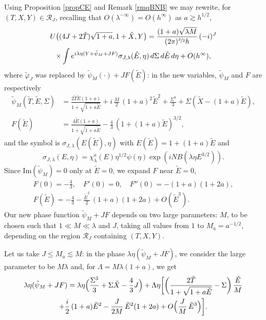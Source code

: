 \documentclass[JEP,XML,SOM,Unicode,NoEqCountersInSection,NoFloatCountersInSection,published]{cedram}
\let\mathcal\mathscr
\theoremstyle{plain}
\theoremstyle{definition}
\newcommand{\DomainXYT}{\mathcal{R}}
\begin{document}
Using Proposition \ref{propCE} and Remark \ref{rmqBNB} we may rewrite, for $(T,X,Y)\in \DomainXYT_{J}$, recalling that $O(\lambda^{-\infty})=O(h^{\infty})$ as $a\gtrsim h^{1/2}$,
\begin{multline}
\label{eq:67}
U\bigl((4J+2\tilde T)\sqrt{1+a},1+\tilde X,Y\bigr) = \frac{(1+a)\sqrt {\lambda M}}{(2\pi)^{\sfrac 32}h}\, (-i)^{J} \\
\times \int e^{i\lambda\eta (Y+\tilde\psi_{M}+JF)} \sigma_{J,\lambda }(\tilde E,\eta)\,d\Sigma \,d{\tilde E} \,d\eta +O(h^{\infty}),
\end{multline}
where $\tilde\varphi_J$ was replaced by $\tilde\psi_{M}(\cdot)+JF({\tilde E})$: in the new variables, $\tilde\psi_{M}$ and $F$ are respectively
\begin{align*}
\tilde\psi_{M} (\tilde T,{\tilde E},\Sigma) & =\frac{2\tilde T {\tilde E}(1+a)}{1+\sqrt{1+a{\tilde E}}}+i\,\frac M2\, (1+a)^2 {\tilde E}^2+\frac{\Sigma^3}{3}+\Sigma(\tilde X-(1+a){\tilde E}), \\
\label{eq:68}
F({\tilde E}) & =\frac{4{\tilde E}(1+a)}{1+\sqrt{1+a{\tilde E}}}-\frac 43\, (1+(1+a){\tilde E})^{3/2},
\end{align*}
and the symbol is $\sigma_{J,\lambda}(E(\tilde E),\eta)$ with $E(\tilde E)=1+(1+a)\tilde E$ and
\[
\sigma_{J,\lambda}(E,\eta)=\chi^a_{\lambda}(E)\eta^{1/2}\psi(\eta) \exp(i NB(\lambda \eta E^{3/2})).
\]
Since $\mathrm{Im}(\tilde\psi_{M})=0$ only at ${\tilde E}=0$, we expand $F$ near ${\tilde E}=0$,
\begin{gather*}
F(0)=-\frac 43, \quad F'(0)=0, \quad F''(0)=-(1+a)(1+2a),\\
F({\tilde E})= -\frac 43-\frac{{\tilde E}^2}{2}\,(1+a)(1+2a)+O({\tilde E}^3).
\end{gather*}
Our new phase function $\tilde\psi_{M}+JF$ depends on two large parameters: $M$, to be chosen such that $1\ll M\ll\lambda $ and $J$, taking all values from $1$ to $M_a=a^{-1/2}$, depending on the region $\DomainXYT_J$ containing $(T,X,Y)$.

Let us take $J\leq M_a\lesssim M$: in the phase $\lambda\eta(\tilde\psi_{M}+JF)$, we consider the large parameter to be $M\lambda$ and, for $\Lambda= M \lambda (1+a)$, we get
\begin{multline*}\label{eq:phaUj}
\lambda\eta(\tilde\psi_{M}+JF)=\lambda \eta \Big(\frac{\Sigma^3}{3}+\Sigma \tilde X-\frac 43 J\Big)+
\Lambda \eta\biggl[\biggl(\frac{2\tilde T}{1+\sqrt{1+a{\tilde E}}}-\Sigma\biggr)\,\frac {\tilde E}M\\
+\frac i2\, (1+a){\tilde E}^2-\frac{J}{2M}\,{\tilde E}^2(1+2a)+O\Bigl(\frac{J}{M}\,{\tilde E}^3\Bigr)\biggr].
\end{multline*}
\end{document}
